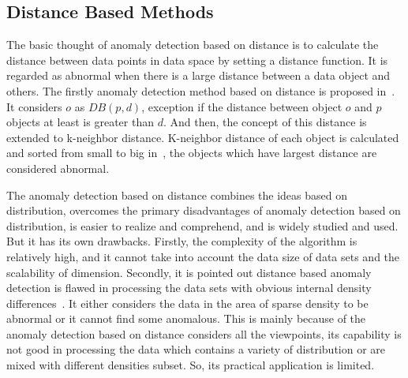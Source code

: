 \subsection{Distance Based Methods}

The basic thought of anomaly detection based on
distance is to calculate the distance between data points in
data space by setting a distance function.
It is regarded as
abnormal when there is a large distance between a data
object and others.
The  firstly anomaly detection method 
based on distance is proposed in~\cite{knorr1997unified}.
It considers $o$ as $DB(p,d)$,
exception if the distance between object $o$ and
$p$ objects at least is greater than $d$.
And then,
the concept of this distance is extended to k-neighbor distance.
K-neighbor distance of each object is calculated and
sorted from small to big in~\cite{ramaswamy2000efficient},
the objects which have largest
distance are considered abnormal.

The anomaly detection based on distance combines the ideas
based on distribution,
overcomes the primary disadvantages
of anomaly detection based on distribution,
is easier to realize and comprehend,
and is widely studied and used.
But it has its own drawbacks.
Firstly,
the complexity of the algorithm is relatively high,
and it cannot take into account
the data size of data sets and the scalability of dimension.
Secondly,
it is pointed out distance based anomaly detection is flawed in
processing the data sets with obvious internal density
differences~\cite{breunig2000lof}.
It either considers the data in the area of sparse
density to be abnormal or
it cannot find some anomalous.
This is mainly because of the anomaly detection based on
distance considers all the viewpoints,
its capability is not good in processing the data which
contains a variety of distribution or
are mixed with different densities subset.
So,
its practical application is limited.

